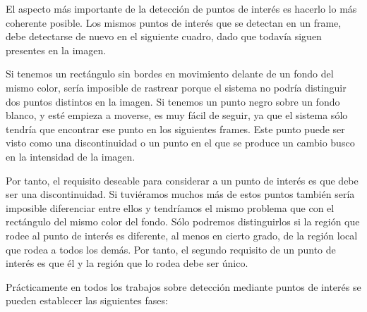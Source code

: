 El aspecto más importante de la detección de puntos de interés es hacerlo lo más coherente posible. Los mismos puntos de interés que se detectan en un frame, debe detectarse de nuevo en el siguiente cuadro, dado que todavía siguen presentes en la imagen. 

Si tenemos un rectángulo sin bordes en movimiento delante de un fondo del mismo color, sería imposible de rastrear porque el sistema no podría distinguir dos puntos distintos en la imagen. Si tenemos un punto negro sobre un fondo blanco, y esté empieza a moverse, es muy fácil de seguir, ya que el sistema sólo tendría que encontrar ese punto en los siguientes frames. Este punto puede ser visto como una discontinuidad o un punto en el que se produce un cambio busco en la intensidad de la imagen.

Por tanto, el requisito deseable para considerar a un punto de interés es que debe ser una discontinuidad. Si tuviéramos muchos más de estos puntos también sería imposible diferenciar entre ellos y tendríamos el mismo problema que con el rectángulo del mismo color del fondo. Sólo podremos distinguirlos si la región que rodee al punto de interés es diferente, al menos en cierto grado, de la región local que rodea a todos los demás. Por tanto, el segundo requisito de un punto de interés es que él y la región que lo rodea debe ser único. 

Prácticamente en todos los trabajos sobre detección mediante puntos de interés se pueden establecer las siguientes fases:


